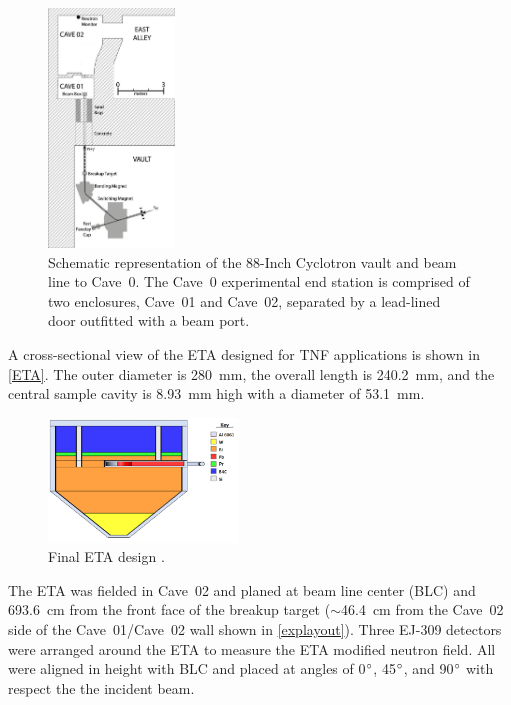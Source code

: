 \documentclass[twocolumn,10pt,final]{asme2ej}
\begin{document}
\vspace{-0.4 cm}
\begin{figure} [htp!]
\centering
\includegraphics[width=0.30\textwidth]{../figs/vault_scaled.eps}
\caption{Schematic representation of the 88-Inch Cyclotron vault and beam line to Cave~0. The Cave~0 experimental end station is comprised of two enclosures, Cave~01 and Cave~02, separated by a lead-lined door outfitted with a beam port.}
\label{explayout}
\vspace{-0.4 cm}
\end{figure}

A cross-sectional view of the ETA designed for TNF applications is shown in \autoref{ETA}.
The outer diameter is 280~mm, the overall length is 240.2~mm, and the central sample cavity is 8.93~mm high with a diameter of 53.1~mm.

\begin{figure} [htp!]
 \centering
 \includegraphics[trim = 0cm 0cm 0cm 0cm, clip, width=0.45\textwidth]{../Figs/ETA.png}
   \caption{Final ETA design \cite{Bevins2017}.}
     \label{ETA}
\vspace{-0.4 cm}
\end{figure}


The ETA was fielded in Cave~02 and planed at beam line center (BLC) and 693.6~cm from the front face of the breakup target ($\sim$46.4~cm from the Cave~02 side of the Cave~01/Cave~02 wall shown in \autoref{explayout}).
Three EJ-309 detectors were arranged around the ETA to measure the ETA modified neutron field.
All were aligned in height with BLC and placed at angles of 0$\degree$, 45$\degree$, and 90$\degree$ with respect the the incident beam.  
\end{document}
